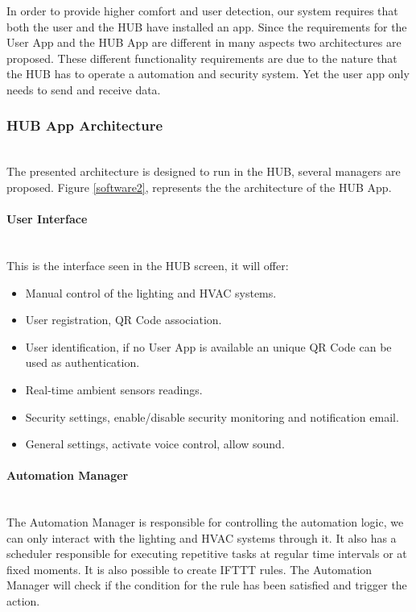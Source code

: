 In order to provide higher comfort and user detection, our system requires that both the user and the HUB have installed an app. Since the requirements for the User App and the HUB App are different in many aspects two architectures are proposed. These different functionality requirements are due to the nature that the HUB has to operate a automation and security system. Yet the user app only needs to send and receive data.
\subsubsection{HUB App Architecture}\mbox{}\\

The presented architecture is designed to run in the HUB, several managers are proposed. Figure \ref{software2}, represents the the architecture of the HUB App.

\paragraph{User Interface}\mbox{}\\
This is the interface seen in the HUB screen, it will offer:

\begin{itemize}
  \item Manual control of the lighting and HVAC systems.
  \item User registration, QR Code association.
  \item User identification, if no User App is available an unique QR Code can be used as authentication.
  \item Real-time ambient sensors readings.
  \item Security settings, enable/disable security monitoring and notification email.
  \item General settings, activate voice control, allow sound.
   
\end{itemize}

\paragraph{Automation Manager}\mbox{}\\
The Automation Manager is responsible for controlling the automation logic, we can only interact with the lighting and HVAC systems through it. It also has a scheduler responsible for executing repetitive tasks at regular time intervals or at fixed moments. It is also possible to create IFTTT rules. The Automation Manager will check if the condition for the rule has been satisfied and trigger the action.


